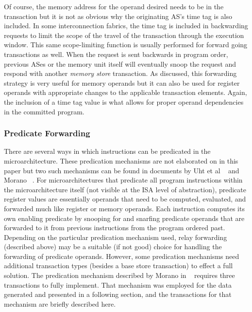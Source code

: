 \documentclass[10pt,dvips]{article}
\begin{document}
%
Of course, the memory address for the operand desired
needs to be in the transaction but it is not as obvious why
the originating AS's time tag is also included.  In some
interconnection fabrics, the time tag is included in backwarding
requests to limit the scope of the travel of the transaction
through the execution window.  This same scope-limiting function
is usually performed for forward going transactions as well.
When the request is sent backwards in program order, previous
ASes or the memory unit itself will eventually snoop
the request and respond with another \textit{memory store}
transaction.
As discussed, this forwarding strategy is very useful for memory
operands but it can also be used for register operands with
appropriate changes to the applicable transaction elements.
Again, the inclusion of a time tag value is what allows
for proper operand dependencies 
in the committed program.
%
\subsubsection{Predicate Forwarding}
%
There are several ways in which instructions can be predicated
in the microarchitecture.  
These predication mechanisms are not elaborated on in
this paper but two such mechanisms can be found in
documents by Uht et al ~\cite{Uht01} and Morano ~\cite{Morano02}.
For microarchitectures that predicate all program instructions
within the microarchitecture itself (not visible at the ISA
level of abstraction), predicate register values are essentially
operands that need to be computed, evaluated, and forwarded
much like register or memory operands.
Each instruction computes its own enabling predicate by
snooping for and snarfing predicate operands that are forwarded
to it from previous instructions from the program ordered past.
Depending on the particular predication mechanism used,
relay forwarding (described above) may be a suitable (if not good) choice 
for handling the forwarding of predicate operands.
However, some predication mechanisms need additional transaction
types (besides a base store transaction) to effect a full solution.
The predication mechanism described by Morano in ~\cite{Morano02}
requires three transactions to fully implement.
That mechanism was employed for the data generated and presented in
a following section, and the transactions for that mechanism
are briefly described here.
\end{document}
